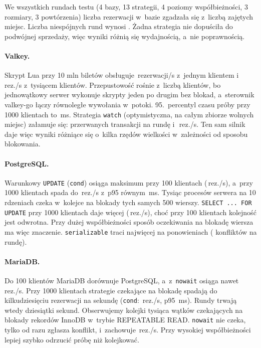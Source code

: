 We wszystkich \ContentionRuns{} rundach testu (4 bazy, 13 strategii, 4 poziomy
współbieżności, 3 rozmiary, 3 powtórzenia) liczba rezerwacji w~bazie zgadzała
się z~liczbą zajętych miejsc. Liczba niespójnych rund wynosi
\ContentionInconsistent. Żadna strategia nie dopuściła do podwójnej sprzedaży,
więc wyniki różnią się wydajnością, a~nie poprawnością.

\paragraph{Valkey.} Skrypt Lua przy 10 mln biletów obsługuje
\,rezerwacji/s z~jednym klientem
i~\,rez./s z~tysiącem klientów. Przepustowość
rośnie z~liczbą klientów, bo jednowątkowy serwer wykonuje skrypty jeden po
drugim bez blokad, a~sterownik valkey-go łączy równoległe wywołania w~potoki.
95.~percentyl czasu próby przy 1000 klientach to \,ms.
Strategia \texttt{watch} (optymistyczna, na całym zbiorze wolnych miejsc)
załamuje się:  przerwanych transakcji na
rundę i~\,rez./s. Ten sam silnik daje więc
wyniki różniące się o~kilka rzędów wielkości w~zależności od sposobu blokowania.

\paragraph{PostgreSQL.} Warunkowy \texttt{UPDATE} (\texttt{cond}) osiąga
maksimum przy 100 klientach (\,rez./s),
a~przy 1000 klientach spada do \,rez./s
z~p95 równym \,ms. Tysiąc procesów
serwera na 10 rdzeniach czeka w~kolejce na blokady tych samych 500 wierszy.
\texttt{SELECT ... FOR UPDATE} przy 1000 klientach daje więcej
(\,rez./s), choć przy 100 klientach
kolejność jest odwrotna. Przy dużej współbieżności sposób oczekiwania na
blokadę wiersza ma więc znaczenie.
\texttt{serializable} traci najwięcej na ponowieniach
( konfliktów na rundę).

\paragraph{MariaDB.} Do 100 klientów MariaDB dorównuje PostgreSQL, a~z~\texttt{nowait}
osiąga nawet \,rez./s. Przy 1000 klientach
strategie czekające na blokadę spadają do kilkudziesięciu rezerwacji na
sekundę (\texttt{cond}: \,rez./s,
p95 \,ms). Rundy trwają wtedy dziesiątki
sekund. Obserwujemy kolejki tysiąca wątków czekających na blokady rekordów
InnoDB w~trybie REPEATABLE READ. \texttt{nowait} nie czeka, tylko od razu
zgłasza konflikt, i~zachowuje \,rez./s.
Przy wysokiej współbieżności lepiej szybko odrzucić próbę niż kolejkować.

